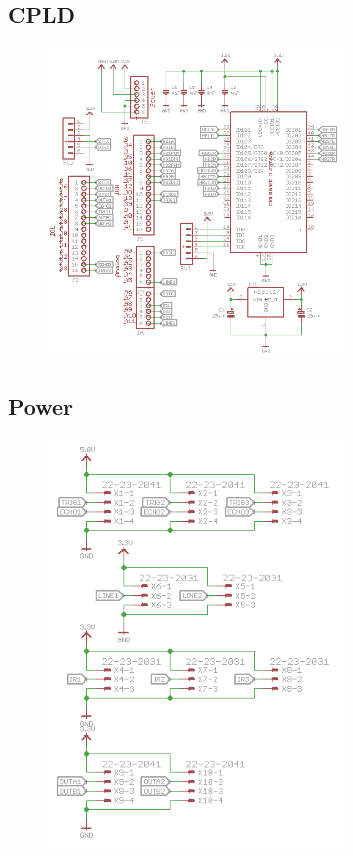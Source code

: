 \subsection{CPLD}
\begin{figure}[!ht]
	\centering
	\includegraphics[width=0.7\textwidth]{figures/CPLD.PNG}
	\caption{}
	\label{Hardware diagram}
\end{figure}

\subsection{Power}

\begin{figure}[!ht]
	\centering
	\includegraphics[width=0.7\textwidth]{figures/Power.PNG}
	\caption{}
	\label{Hardware diagram}
\end{figure}

